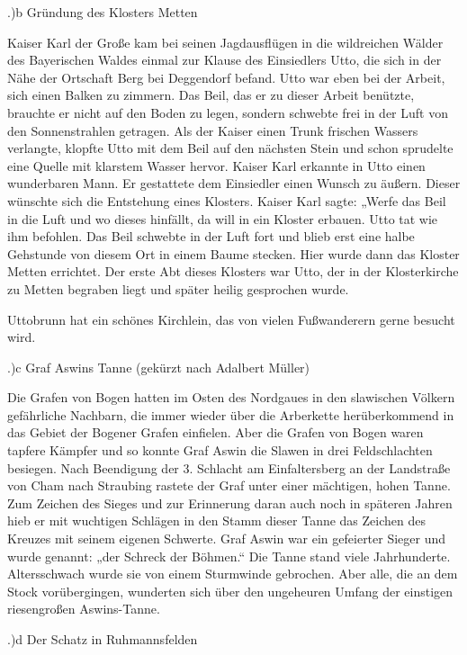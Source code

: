 .)b Gründung des Klosters Metten

Kaiser Karl der Große kam bei seinen Jagdausflügen in die wildreichen Wälder des
Bayerischen Waldes einmal zur Klause des Einsiedlers Utto, die sich in der Nähe
der Ortschaft Berg bei Deggendorf befand. Utto war eben bei der Arbeit, sich
einen Balken zu zimmern. Das Beil, das er zu dieser Arbeit benützte, brauchte er
nicht auf den Boden zu legen, sondern schwebte frei in der Luft von den
Sonnenstrahlen getragen. Als der Kaiser einen Trunk frischen Wassers verlangte,
klopfte Utto mit dem Beil auf den nächsten Stein und schon sprudelte eine Quelle
mit klarstem Wasser hervor. Kaiser Karl erkannte in Utto einen wunderbaren Mann.
Er gestattete dem Einsiedler einen Wunsch zu äußern. Dieser wünschte sich die
Entstehung eines Klosters. Kaiser Karl sagte: „Werfe das Beil in die Luft und wo
dieses hinfällt, da will in ein Kloster erbauen. Utto tat wie ihm befohlen. Das
Beil schwebte in der Luft fort und blieb erst eine halbe Gehstunde von diesem
Ort in einem Baume stecken. Hier wurde dann das Kloster Metten errichtet. Der
erste Abt dieses Klosters war Utto, der in der Klosterkirche zu Metten begraben
liegt und später heilig gesprochen wurde.

Uttobrunn hat ein schönes Kirchlein, das von vielen Fußwanderern gerne besucht
wird.

.)c Graf Aswins Tanne (gekürzt nach Adalbert Müller)

Die Grafen von Bogen hatten im Osten des Nordgaues in den slawischen Völkern
gefährliche Nachbarn, die immer wieder über die Arberkette herüberkommend in das
Gebiet der Bogener Grafen einfielen. Aber die Grafen von Bogen waren tapfere
Kämpfer und so konnte Graf Aswin die Slawen in drei Feldschlachten besiegen.
Nach Beendigung der 3. Schlacht am Einfaltersberg an der Landstraße von Cham
nach Straubing rastete der Graf unter einer mächtigen, hohen Tanne. Zum Zeichen
des Sieges und zur Erinnerung daran auch noch in späteren Jahren hieb er mit
wuchtigen Schlägen in den Stamm dieser Tanne das Zeichen des Kreuzes mit seinem
eigenen Schwerte. Graf Aswin war ein gefeierter Sieger und wurde genannt: „der
Schreck der Böhmen.“ Die Tanne stand viele Jahrhunderte. Altersschwach wurde sie
von einem Sturmwinde gebrochen. Aber alle, die an dem Stock vorübergingen,
wunderten sich über den ungeheuren Umfang der einstigen riesengroßen
Aswins-Tanne.

.)d Der Schatz in Ruhmannsfelden

